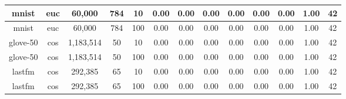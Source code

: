 \begin{table*}[!t]
\begin{center}
\begin{small}
\begin{sc}
\begin{tabular}{|c|c|c|c|c|c|c|c|c|c|c|c|c|}
    \hline
    mnist            & euc              & 60,000             & 784             & 10          & 0.00 & 0.00                          & 0.00 & 0.00                                 & 0.00 & 0.00                                                    & 1.00 & 42 \\
    \hline
    mnist            & euc              & 60,000             & 784             & 100         & 0.00 & 0.00                          & 0.00 & 0.00                                  & 0.00 & 0.00                                                    & 1.00 & 42 \\
    \hline
    glove-50         & cos              & 1,183,514          & 50             & 10          & 0.00 & 0.00                           & 0.00 & 0.00                              & 0.00 & 0.00                                                    & 1.00 & 42 \\
    \hline
    glove-50         & cos              & 1,183,514          & 50             & 100         & 0.00 & 0.00                           & 0.00 & 0.00                              & 0.00 & 0.00                                                    & 1.00 & 42 \\
    \hline
    lastfm           & cos              & 292,385            & 65             & 10          & 0.00 & 0.00                           & 0.00 & 0.00                               & 0.00 & 0.00                                                    & 1.00 & 42 \\
    \hline
    lastfm           & cos              & 292,385            & 65             & 100         & 0.00 & 0.00                           & 0.00 & 0.00                             & 0.00 & 0.00                                                    & 1.00 & 42 \\
    \hline
    \end{tabular}
    \end{sc}
    \end{small}
    \end{center}
    \vskip -0.1in
    \end{table*}
    
